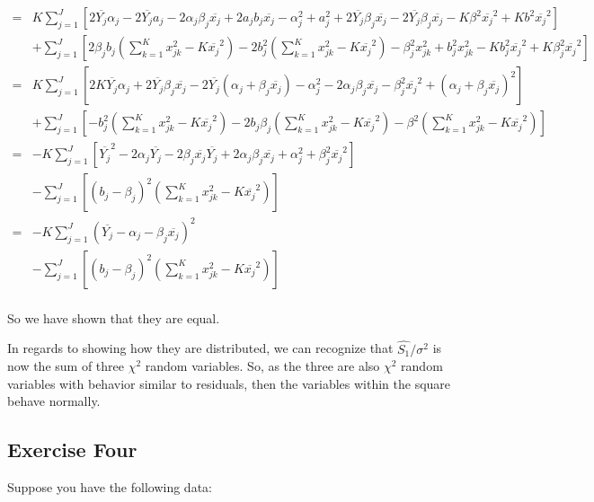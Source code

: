 \documentclass[]{article}
\begin{document}
\begin{align*}
=& K\sum_{j=1}^J \left[2\overline{Y_j}\alpha_j - 2\overline{Y_j}a_j - 2\alpha_j\beta_j\overline{x_j} + 2a_jb_j\overline{x_j} - \alpha_j^2 + a_j^2 + 2\overline{Y_j}\beta_j\overline{x_j} - 2\overline{Y_j}\beta_j\overline{x_j} - K\beta^2\overline{x_j}^2 + Kb^2\overline{x_j}^2 \right]\\
 &+ \sum_{j=1}^J \left[2\beta_jb_j(\sum_{k=1}^Kx_{jk}^2 - K\overline{x_j}^2) - 2b_j^2(\sum_{k=1}^Kx_{jk}^2 - K\overline{x_j}^2) - \beta_j^2x_{jk}^2 + b_j^2x_{jk}^2 - Kb_j^2\overline{x_j}^2 + K\beta_j^2\overline{x_j}^2\right]\\
=& K\sum_{j=1}^J \left[2K\overline{Y_j}\alpha_j + 2\overline{Y_j}\beta_j\overline{x_j} - 2\overline{Y_j}(\alpha_j + \beta_j\overline{x_j}) - \alpha_j^2 - 2\alpha_j\beta_j\overline{x_j} - \beta_j^2\overline{x_j}^2 + (\alpha_j + \beta_j\overline{x_j})^2    \right]\\
 &+ \sum_{j=1}^J \left[-b_j^2(\sum_{k=1}^Kx_{jk}^2 - K\overline{x_j}^2) -2b_j\beta_j(\sum_{k=1}^Kx_{jk}^2 - K\overline{x_j}^2) - \beta^2(\sum_{k=1}^Kx_{jk}^2 - K\overline{x_j}^2)    \right]\\
=& -K\sum_{j=1}^J \left[ \overline{Y_j}^2 - 2\alpha_j\overline{Y_j} - 2\beta_j\overline{x_j}\overline{Y_j} + 2\alpha_j\beta_j\overline{x_j} + \alpha_j^2 + \beta_j^2\overline{x_j}^2 \right]\\
 &- \sum_{j=1}^J \left[(b_j - \beta_j)^2(\sum_{k=1}^Kx_{jk}^2 - K\overline{x_j}^2)\right]\\
=& -K\sum_{j=1}^J(\overline{Y_j} - \alpha_j - \beta_j\overline{x_j})^2\\
 &- \sum_{j=1}^J \left[(b_j - \beta_j)^2(\sum_{k=1}^Kx_{jk}^2 - K\overline{x_j}^2)\right]\\
\end{align*}

So we have shown that they are equal.

In regards to showing how they are distributed, we can recognize that
\(\hat{S_1}/\sigma^2\) is now the sum of three \(\chi^2\) random
variables. So, as the three are also \(\chi^2\) random variables with
behavior similar to residuals, then the variables within the square
behave normally.

\subsection{Exercise Four}\label{exercise-four}

Suppose you have the following data:
\end{document}
